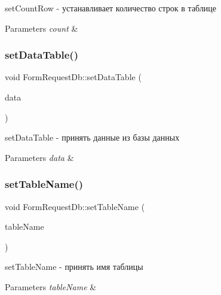 set\+Count\+Row -\/ устанавливает количество строк в таблице 


\begin{DoxyParams}{Parameters}
{\em count} & \\
\hline
\end{DoxyParams}
\mbox{\label{classFormRequestDb_a6344496d9d92e92078dacf8218cae768}} 
\subsubsection{\texorpdfstring{set\+Data\+Table()}{setDataTable()}}
{\footnotesize\ttfamily void Form\+Request\+Db\+::set\+Data\+Table (\begin{DoxyParamCaption}\item[{const Q\+String\+List \&}]{data }\end{DoxyParamCaption})}



set\+Data\+Table -\/ принять данные из базы данных 


\begin{DoxyParams}{Parameters}
{\em data} & \\
\hline
\end{DoxyParams}
\mbox{\label{classFormRequestDb_ac5fe463263f876ef7e6531b99d6f224d}} 
\subsubsection{\texorpdfstring{set\+Table\+Name()}{setTableName()}}
{\footnotesize\ttfamily void Form\+Request\+Db\+::set\+Table\+Name (\begin{DoxyParamCaption}\item[{const Q\+String \&}]{table\+Name }\end{DoxyParamCaption})}



set\+Table\+Name -\/ принять имя таблицы 


\begin{DoxyParams}{Parameters}
{\em table\+Name} & \\
\hline
\end{DoxyParams}
\mbox{\label{classFormRequestDb_a8e2f772b54c5bc321bb2aafd410881af}} 
